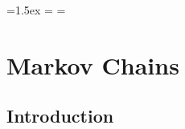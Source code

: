 \newdimen\snellbaselineskip
\newdimen\snellskip
\snellskip=1.5ex
\snellbaselineskip=\baselineskip
\def\srule{\omit\kern.5em\vrule\kern-.5em}
\newbox\bigstrutbox
\setbox\bigstrutbox=\hbox{\vrule height14.5pt depth9.5pt width0pt}
\def\bigstrut{\relax\ifmmode\copy\bigstrutbox\else\unhcopy\bigstrutbox\fi}
\def\middlehrule#1#2{\noalign{\kern-\snellbaselineskip\kern\snellskip}
&\multispan#1\strut\hrulefill
&\omit\hbox to.5em{\hrulefill}\vrule 
height \snellskip\kern-.5em&\multispan#2\hrulefill\cr}

\makeatletter
\def\bordermatrix#1{\begingroup \m@th
  \@tempdima 8.75\p@
  \setbox\z@\vbox{%
    \def\cr{\crcr\noalign{\kern2\p@\global\let\cr\endline}}%
    \ialign{$##$\hfil\kern2\p@\kern\@tempdima&\thinspace\hfil$##$\hfil
      &&\quad\hfil$##$\hfil\crcr
      \omit\strut\hfil\crcr\noalign{\kern-\snellbaselineskip}%
      #1\crcr\omit\strut\cr}}%
  \setbox\tw@\vbox{\unvcopy\z@\global\setbox\@ne\lastbox}%
  \setbox\tw@\hbox{\unhbox\@ne\unskip\global\setbox\@ne\lastbox}%
  \setbox\tw@\hbox{$\kern\wd\@ne\kern-\@tempdima\left(\kern-\wd\@ne
    \global\setbox\@ne\vbox{\box\@ne\kern2\p@}%
    \vcenter{\kern-\ht\@ne\unvbox\z@\kern-\snellbaselineskip}\,\right)$}%
  \null\;\vbox{\kern\ht\@ne\box\tw@}\endgroup}

\makeatother




\chapter{Markov Chains}\label{chp 11}  

\section{Introduction}\label{sec 11.1}

